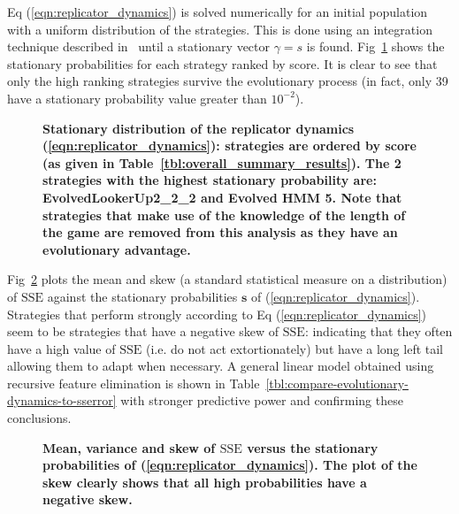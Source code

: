 \documentclass[10pt,letterpaper]{article}
\newcommand{\SSe}{\text{SSE}}
\begin{document}
Eq (\ref{eqn:replicator_dynamics}) is solved numerically for an initial
population with a uniform distribution of the strategies. This is done using an
integration technique described in~\cite{Petzold1983} until a stationary vector
\(\gamma=s\) is found.
Fig~\ref{fig:replicator_dynamics} shows the stationary probabilities for each
strategy ranked by score.
It is clear to see that
only the high ranking strategies survive the evolutionary process (in fact,
only 39 have a stationary
probability value greater than \(10 ^ {-2}\)).

\begin{figure}[!htbp]
    \centering
    \caption{{\bf Stationary distribution of the replicator dynamics
    (\ref{eqn:replicator_dynamics}): strategies are ordered by score (as given
    in Table~\ref{tbl:overall_summary_results}). The 2
    strategies with the highest stationary probability are:
    EvolvedLookerUp2\_2\_2 and Evolved HMM 5.
    Note that
    strategies that make use of the knowledge of the length of the game are
    removed from this analysis as they have an evolutionary advantage.}}
    \label{fig:replicator_dynamics}
\end{figure}

Fig~\ref{fig:compare-evolutionary-dynamics-to-sserror} plots the mean and
skew (a standard statistical measure on a distribution) of \(\SSe\) against the
stationary probabilities \(\textbf{s}\) of (\ref{eqn:replicator_dynamics}). Strategies
that perform strongly according to Eq (\ref{eqn:replicator_dynamics}) seem
to be strategies that have a negative skew of \(\SSe\): indicating that they
often have a high value of \(\SSe\) (i.e. do not act extortionately) but have a
long left tail allowing them to adapt when necessary. A general linear model
obtained using recursive feature elimination is shown in
Table~\ref{tbl:compare-evolutionary-dynamics-to-sserror} with stronger
predictive power and confirming these conclusions.

\begin{figure}[!hbtp]
    \centering
    \caption{{\bf Mean, variance and skew of \(\SSe\) versus the stationary
    probabilities of (\ref{eqn:replicator_dynamics}). The plot of the skew
    clearly shows that all high probabilities have a negative skew.}}
    \label{fig:compare-evolutionary-dynamics-to-sserror}
\end{figure}
\end{document}
